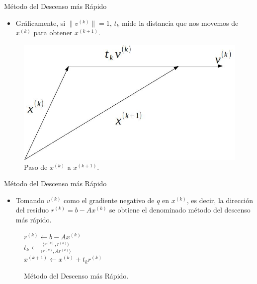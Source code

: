 \documentclass[10pt]{beamer}
\begin{document}
\begin{frame}{M\'etodo del Descenso m\'as R\'apido}
  \begin{itemize}
    \item<1->Gr\'aficamente, si $\|v^{(k)}\|=1$, $t_k$ mide la distancia que nos movemos de $x^{(k)}$ para obtener $x^{(k+1)}$.
  \end{itemize}
  \begin{figure}[h]
    \begin{center}
      \includegraphics[scale=0.25]{./paso_descenso.jpg}
    \end{center}
    \caption{Paso de $x^{(k)}$ a $x^{(k+1)}$.}    
    \end{figure}
\end{frame}    
\begin{frame}{M\'etodo del Descenso m\'as R\'apido}
  \begin{itemize}
    \item Tomando $v^{(k)}$ como el gradiente negativo de $q$ en $x^{(k)}$, es decir, la direcci\'on del residuo $r^{(k)}=b-Ax^{(k)}$ se obtiene el denominado m\'etodo del descenso m\'as r\'apido. 
  \end{itemize}
\begin{figure}[h]
\begin{algorithm}[H] 
 \caption{M\'etodo del Descenso m\'as R\'apido.}
 {
   $r^{(k)} \leftarrow b-Ax^{(k)}$\\
   $t_k \leftarrow \displaystyle\frac{\langle r^{(k)},r^{(k)}\rangle}{\langle r^{(k)},Ar^{(k)}\rangle}$\\
   $x^{(k+1)} \leftarrow x^{(k)}+t_kr^{(k)}$
 }
\end{algorithm}
\end{figure}
\end{frame}
\end{document}
